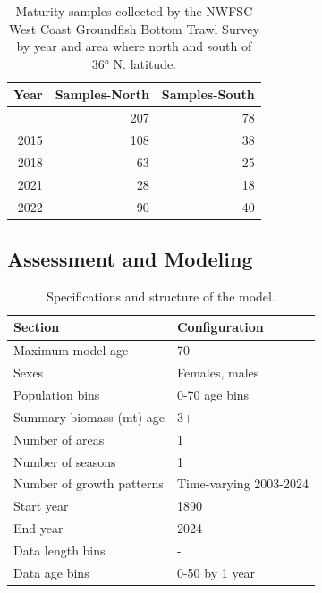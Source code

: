 \documentclass[
  english,
]{article}
\begin{document}
\begingroup
\fontsize{9.0pt}{11.0pt}\selectfont

\begin{longtable}{rrr}

\caption{\label{tbl-maturity-samples}Maturity samples collected by the
NWFSC West Coast Groundfish Bottom Trawl Survey by year and area where
north and south of 36° N. latitude.}

\tabularnewline

\toprule
Year & Samples-North & Samples-South \\ 
\midrule\addlinespace[2.5pt]
2010 & 207 & 78 \\ 
2015 & 108 & 38 \\ 
2018 & 63 & 25 \\ 
2021 & 28 & 18 \\ 
2022 & 90 & 40 \\ 
\bottomrule

\end{longtable}

\endgroup

\newpage{}

\subsection{Assessment and Modeling}\label{assessment-and-modeling}

\begingroup
\fontsize{9.0pt}{11.0pt}\selectfont

\begin{longtable}{ll}

\caption{\label{tbl-model-config}Specifications and structure of the
model.}

\tabularnewline

\toprule
Section & Configuration \\ 
\midrule\addlinespace[2.5pt]
Maximum model age & 70 \\ 
Sexes & Females, males \\ 
Population bins & 0-70 age bins \\ 
Summary biomass (mt) age & 3+ \\ 
Number of areas & 1 \\ 
Number of seasons & 1 \\ 
Number of growth patterns & Time-varying 2003-2024 \\ 
Start year & 1890 \\ 
End year & 2024 \\ 
Data length bins & - \\ 
Data age bins & 0-50 by 1 year \\ 
\bottomrule

\end{longtable}
\end{document}
